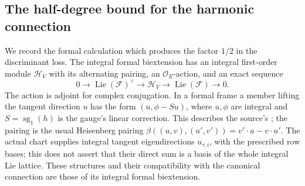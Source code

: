 \subsection{The half-degree bound for the harmonic connection}
\label{subsec:ftb-half-degree-connection}

We record the formal calculation which produces the factor \(1/2\)
in the discriminant loss.
The integral formal biextension has an integral first-order module
\(\mathcal H_V\) with its alternating pairing, an
\(\mathcal O_E\)-action, and an exact sequence
\[
              0\longrightarrow\operatorname{Lie}(\mathcal F)^\vee
               \longrightarrow\mathcal H_V
               \longrightarrow\operatorname{Lie}(\mathcal F)
               \longrightarrow0 .
\]
The action is adjoint for complex conjugation.
In a formal frame a member lifting the tangent direction \(u\) has
the form \((u,\phi-Su)\), where \(u,\phi\) are integral and
\(S=\operatorname{sg}_1(h)\) is the gauge's linear correction.
This describes the source's ; the pairing is the
usual Heisenberg pairing
\(\beta((u,v),(u',v'))=v'\cdot u-v\cdot u'\).
The actual chart supplies integral tangent eigendirections
\(u_{\tau,i}\), with the prescribed row bases; this does not assert
that their direct sum is a basis of the whole integral Lie lattice.
These structures and their compatibility with the canonical
connection are those of its integral formal biextension.

